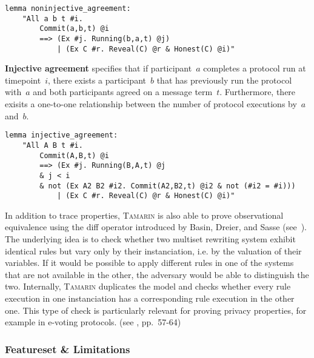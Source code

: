\begin{lstlisting}[caption={Tamarin non-injective agreement query, according to \cite{tamarin2019manual},~p.~75},label={lst:tamarin-niagreement}]
lemma noninjective_agreement:
    "All a b t #i.
        Commit(a,b,t) @i
        ==> (Ex #j. Running(b,a,t) @j)
            | (Ex C #r. Reveal(C) @r & Honest(C) @i)"
\end{lstlisting}

\textbf{Injective agreement} specifies that if participant~$a$ completes a protocol run at timepoint~$i$, there exists a participant~$b$ that has previously run the protocol with~$a$ and both participants agreed on a message term~$t$.
Furthermore, there exisits a one-to-one relationship between the number of protocol executions by~$a$ and~$b$.

\begin{lstlisting}[caption={Tamarin injective agreement query, according to \cite{tamarin2019manual},~p.~75},label={lst:tamarin-iagreement}]
lemma injective_agreement:
    "All A B t #i.
        Commit(A,B,t) @i
        ==> (Ex #j. Running(B,A,t) @j
        & j < i
        & not (Ex A2 B2 #i2. Commit(A2,B2,t) @i2 & not (#i2 = #i)))
            | (Ex C #r. Reveal(C) @r & Honest(C) @i)"
\end{lstlisting}

In addition to trace properties, \textsc{Tamarin} is also able to prove observational equivalence using the \textsf{diff} operator introduced by Basin, Dreier, and Sasse (see~\cite{basin2015automated}).
The underlying idea is to check whether two multiset rewriting system exhibit identical rules but vary only by their instanciation, i.e. by the valuation of their variables.
If it would be possible to apply different rules in one of the systems that are not available in the other, the adversary would be able to distinguish the two.
Internally, \textsc{Tamarin} duplicates the model and checks whether every rule execution in one instanciation has a corresponding rule execution in the other one.
This type of check is particularly relevant for proving privacy properties, for example in e-voting protocols. (see \cite{tamarin2019manual}, pp.~57-64)

\subsubsection{Featureset \& Limitations}

